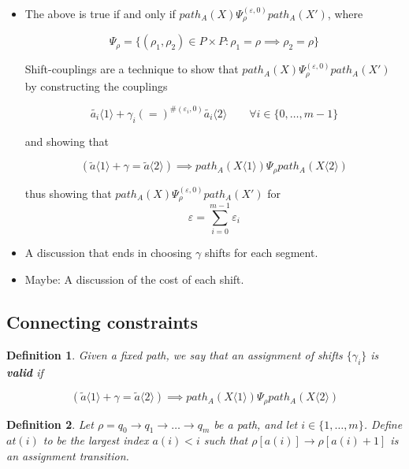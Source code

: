 \documentclass{article}
\newtheorem{definition}{Definition}[section]
\renewcommand{\epsilon}{\varepsilon}
\newcommand{\1}{\langle 1 \rangle}
\newcommand{\2}{\langle 2 \rangle}
\begin{document}
\begin{itemize}
    \item The above is true if and only if $path_A(X) \Psi_\rho^{(\epsilon, 0)} path_A(X')$, where

    \[\Psi_\rho = \{(\rho_1, \rho_2) \in P \times P : \rho_1 = \rho \implies \rho_2 = \rho \} \]
    
    Shift-couplings are a technique to show that $path_A(X) \Psi_\rho^{(\epsilon, 0)} path_A(X')$ by constructing the couplings
    
    \[\tilde{a_i} \1 + \gamma_i (=)^{\#(\epsilon_i, 0)} \tilde{a_i} \2 \qquad \forall i \in \{0, \dots, m - 1\}\]

    and showing that 

    \[(\tilde{a} \1 + \gamma = \tilde{a} \2) \implies path_A(X \1) \Psi_\rho path_A(X \2)\]

    thus showing that $path_A(X) \Psi_\rho^{(\epsilon, 0)} path_A(X')$ for \[\epsilon = \sum_{i = 0}^{m - 1} \epsilon_i\]
    
    
    \item A discussion that ends in choosing $\gamma$ shifts for each segment. 
    \item Maybe: A discussion of the cost of each shift.    
\end{itemize}


\subsection{Connecting constraints} 

\begin{definition}
    
Given a fixed path, we say that an assignment of shifts $\{\gamma_i\}$ is \textbf{valid} if

\[(\tilde{a} \1 + \gamma = \tilde{a} \2) \implies path_A(X \1) \Psi_\rho path_A(X \2)\]

\end{definition}

\begin{definition}
    Let $\rho = q_0 \to q_1 \to \dots \to q_m$ be a path, and let $i \in \{1, \dots, m\}$. Define $at(i)$ to be the largest index $a(i) < i$ such that $\rho[a(i)] \to \rho[a(i) + 1]$ is an assignment transition.  
\end{definition}
\end{document}
